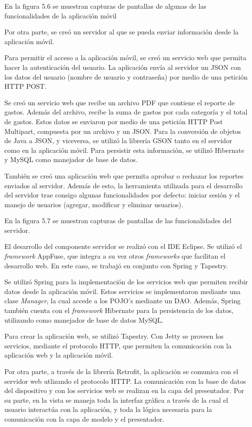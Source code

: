 En la figura 5.6 se muestran capturas de pantallas de algunas de las funcionalidades de la aplicación móvil

Por otra parte, se creó un servidor al que se pueda enviar información desde la aplicación móvil. 

Para permitir el acceso a la aplicación móvil, se creó un servicio web que permita hacer la autenticación del usuario. La aplicación envía al servidor un JSON con los datos del usuario (nombre de usuario y contraseña) por medio de una petición HTTP POST.

Se creó un servicio web que recibe un archivo PDF que contiene el reporte de gastos. Además del archivo, recibe la suma de gastos por cada categoría y el total de gastos. Estos datos se enviaron por medio de una petición HTTP Post Multipart, compuesta por un archivo y un JSON. Para la conversión de objetos de Java a JSON, y viceversa, se utilizó la librería GSON tanto en el servidor como en la aplicación móvil. Para persistir esta información, se utilizó Hibernate y MySQL como manejador de base de datos.

También se creó una aplicación web que permita aprobar o rechazar los reportes enviados al servidor. Además de esto, la herramienta utilizada para el desarrollo del servidor trae consigo algunas funcionalidades por defecto: iniciar sesión y el manejo de usuarios (agregar, modificar y eliminar usuarios).

En la figura 5.7 se muestran capturas de pantallas de las funcionalidades del servidor.

El desarrollo del componente servidor se realizó con el IDE Eclipse. Se utilizó el \textit{framework} AppFuse, que integra a su vez otros \textit{frameworks} que facilitan el desarrollo web. En este caso, se trabajó en conjunto con Spring y Tapestry.

Se utilizó Spring para la implementación de los servicios web que permiten recibir datos desde la aplicación móvil. Estos servicios se implementaron mediante una clase \textit{Manager}, la cual accede a los POJO's mediante un DAO. Además, Spring también cuenta con el \textit{framework} Hibernate para la persistencia de los datos, utilizando como manejador de base de datos MySQL.

Para crear la aplicación web, se utilizó Tapestry. Con Jetty se proveen los servicios, mediante el protocolo HTTP, que permiten la comunicación con la aplicación web y la aplicación  móvil.

Por otra parte, a través de la librería Retrofit, la aplicación se comunica con el servidor web utlizando el protocolo HTTP. La comunicación con la base de datos del dispositivo y con los servicios web se realizan en la capa del presentador. Por su parte, en la vista se maneja toda la interfaz gráfica a través de la cual el usuario interactúa con la aplicación, y toda la lógica necesaria para la comunicación con la capa de modelo y el presentador.

